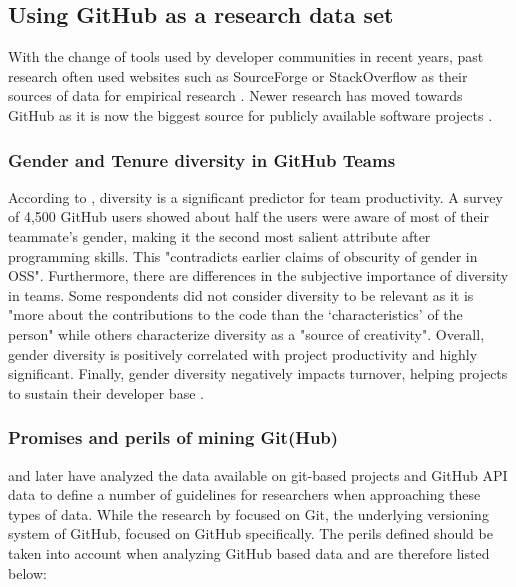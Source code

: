 \subsection{Using GitHub as a research data set}

With the change of tools used by developer communities in recent years, past research often used websites such as SourceForge or StackOverflow as their sources of data for empirical research \cite{vasilescu:2012:6542459,doi:10.1287/mnsc.1060.0550}. Newer research has moved towards GitHub as it is now the biggest source for publicly available software projects \cite{Vasilescu:2015:GTD:2702123.2702549}.

\subsubsection{Gender and Tenure diversity in GitHub Teams}

According to \citeauthor{Vasilescu:2015:GTD:2702123.2702549}, diversity is a significant predictor for team productivity. A survey of 4,500 GitHub users showed about half the users were aware of most of their teammate's gender, making it the second most salient attribute after programming skills. This "contradicts earlier claims of obscurity of gender in OSS". Furthermore, there are differences in the subjective importance of diversity in teams. Some respondents did not consider diversity to be relevant as it is "more about the contributions to the code than the ‘characteristics’ of the person" while others characterize diversity as a "source of creativity". Overall, gender diversity is positively correlated with project productivity and highly significant. Finally, gender diversity negatively impacts turnover, helping projects to sustain their developer base  \cite{Vasilescu:2015:GTD:2702123.2702549}.

\subsubsection{Promises and perils of mining Git(Hub)}


\citeauthor{perils-ms-research:2009} and later \citeauthor{perils-github:2015} have analyzed the data available on git-based projects and GitHub \ac{API} data to define a number of guidelines for researchers when approaching these types of data. While the research by \citeauthor{perils-ms-research:2009} focused on Git, the underlying versioning system of GitHub, \citeauthor{perils-github:2015} focused on GitHub specifically. The perils defined should be taken into account when analyzing GitHub based data and are therefore listed below:

